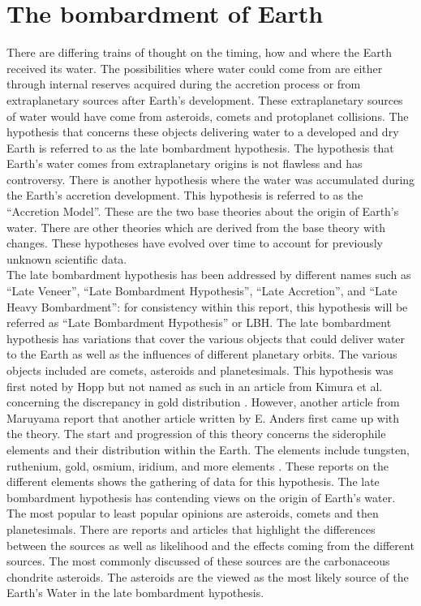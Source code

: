 
\section{The bombardment of Earth}
There are differing trains of thought on the timing, how and where the Earth received its water. The possibilities where water could come from are either through internal reserves acquired during the accretion process or from extraplanetary sources after Earth’s development. These extraplanetary sources of water would have come from asteroids, comets and protoplanet collisions. The hypothesis that concerns these objects delivering water to a developed and dry Earth is referred to as the late bombardment hypothesis. The hypothesis that Earth’s water comes from extraplanetary origins is not flawless and has controversy. There is another hypothesis where the water was accumulated during the Earth’s accretion development. This hypothesis is referred to as the “Accretion Model”. These are the two base theories about the origin of Earth’s water. There are other theories which are derived from the base theory with changes. These hypotheses have evolved over time to account for previously unknown scientific data.\\

The late bombardment hypothesis has been addressed by different names such as “Late Veneer”, “Late Bombardment Hypothesis”, “Late Accretion”, and “Late Heavy Bombardment”: for consistency within this report, this hypothesis will be referred as “Late Bombardment Hypothesis” or LBH. The late bombardment hypothesis has variations that cover the various objects that could deliver water to the Earth as well as the influences of different planetary orbits. The various objects included are comets, asteroids and planetesimals. This hypothesis was first noted by Hopp\cite{BOMB1} but not named as such in an article from Kimura et al. concerning the discrepancy in gold distribution \cite{BOMB2}. However, another article from Maruyama \cite{BOMB3} report that another article written by E. Anders \cite{BOMB4} first came up with the theory. The start and progression of this theory concerns the siderophile elements and their distribution within the Earth. The elements include tungsten, ruthenium, gold, osmium, iridium, and more elements \cite{BOMB5} \cite{BOMB6} \cite{BOMB7}. These reports on the different elements shows the gathering of data for this hypothesis. The late bombardment hypothesis has contending views on the origin of Earth’s water. The most popular to least popular opinions are asteroids, comets and then planetesimals. There are reports and articles \cite{BOMB8} \cite{BOMB9} \cite{BOMB10} that highlight the differences between the sources as well as likelihood and the effects coming from the different sources. The most commonly discussed of these sources are the carbonaceous chondrite asteroids. The asteroids are the viewed as the most likely source of the Earth’s Water in the late bombardment hypothesis.\\

